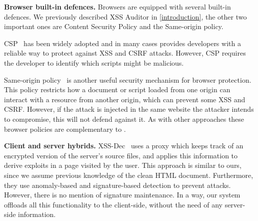 \noindent \textbf{Browser built-in defences.}  Browsers are equipped
with several built-in defences. We previously described XSS
Auditor in \autoref{introduction}, the other two important ones are Content
Security Policy and the Same-origin policy.

\ac{CSP}~\cite{CSP} has been widely adopted and
in many cases provides developers with a reliable way to protect
against \ac{XSS} and \ac{CSRF} attacks. However, \ac{CSP} requires the developer to identify which scripts
might be malicious.

Same-origin policy~\cite{SOP} is another useful security mechanism for browser
protection. This policy restricts how a
document or script loaded from one origin can interact with a resource
from another origin, which can prevent some XSS and CSRF. However, if the attack is injected in the same
website the attacker intends to compromise, this will not defend
against it. As with other approaches these browser policies are complementary to \sys.

\noindent \textbf{Client and server hybrids.}
XSS-Dec~\cite{Sundareswaran:2012:XHS:2352970.2352994} uses a proxy which keeps track of an encrypted version of the server's source files, and applies this information to derive exploits in a page visited by the user. This approach is similar to ours, since we assume previous
knowledge of the clean HTML document. Furthermore, they use anomaly-based and signature-based detection to prevent attacks. However, there is no mention of signature maintenance. In a way, our system offloads all this functionality to the client-side, without the need of any server-side information.

